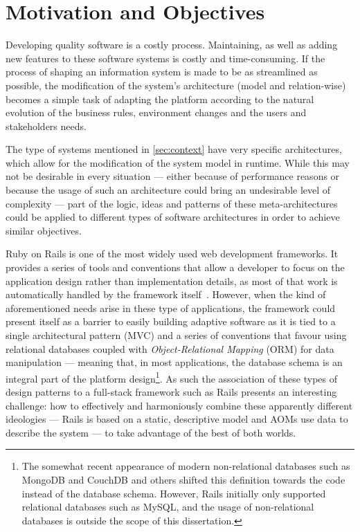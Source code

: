 \section{Motivation and Objectives}\label{sec:goals}

Developing quality software is a costly process. Maintaining, as well as adding new features to these software systems is costly and time-consuming. If the process of shaping an information system is made to be as streamlined as possible, the modification of the system's architecture (model and relation-wise) becomes a simple task of adapting the platform according to the natural evolution of the business rules, environment changes and the users and stakeholders needs.

The type of systems mentioned in \ref{sec:context} have very specific architectures, which allow for the modification of the system model in runtime. While this may not be desirable in every situation --- either because of performance reasons or because the usage of such an architecture could bring an undesirable level of complexity --- part of the logic, ideas and patterns of these meta-architectures could be applied to different types of software architectures in order to achieve similar objectives.

Ruby on Rails is one of the most widely used web development frameworks. It provides a series of tools and conventions that allow a developer to focus on the application design rather than implementation details, as most of that work is automatically handled by the framework itself~\cite{rails_quotes}. However, when the kind of aforementioned needs arise in these type of applications, the framework could present itself as a barrier to easily building adaptive software as it is tied to a single architectural pattern (MVC) and a series of conventions that favour using relational databases coupled with \emph{Object-Relational Mapping} (ORM) for data manipulation --- meaning that, in most applications, the database schema is an integral part of the platform design\footnote{The somewhat recent appearance of modern non-relational databases such as MongoDB and CouchDB and others shifted this definition towards the code instead of the database schema. However, Rails initially only supported relational databases such as MySQL, and the usage of non-relational databases is outside the scope of this dissertation.}. As such the association of these types of design patterns to a full-stack framework such as Rails presents an interesting challenge: how to effectively and harmoniously combine these apparently different ideologies --- Rails is based on a static, descriptive model and AOMs use data to describe the system --- to take advantage of the best of both worlds.

